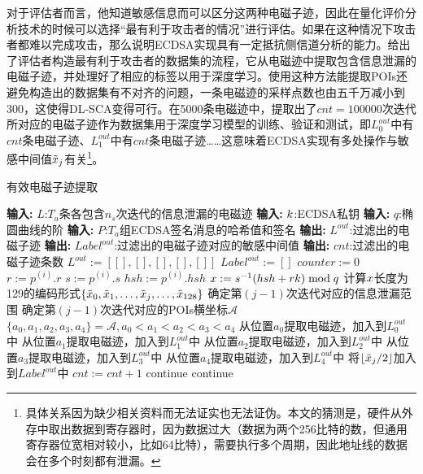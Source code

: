 {{	对于评估者而言，他知道敏感信息而可以区分这两种电磁子迹，因此在量化评价分析技术的时候可以选择“最有利于攻击者的情况”进行评估。如果在这种情况下攻击者都难以完成攻击，那么说明ECDSA实现具有一定抵抗侧信道分析的能力。给出了评估者构造最有利于攻击者的数据集的流程，它从电磁迹中提取包含信息泄漏的电磁子迹，并处理好了相应的标签以用于深度学习。使用这种方法能提取POIs还避免构造出的数据集有不对齐的问题，一条电磁迹的采样点数也由五千万减小到300，这使得DL-SCA变得可行。在5000条电磁迹中，提取出了$cnt=100000$次迭代所对应的电磁子迹作为数据集用于深度学习模型的训练、验证和测试，即$L_0^{out}$中有$cnt$条电磁子迹、$L_1^{out}$中有$cnt$条电磁子迹……这意味着ECDSA实现有多处操作与敏感中间值$\tilde {x}_j$有关\footnote{具体关系因为缺少相关资料而无法证实也无法证伪。本文的猜测是，硬件从外存中取出数据到寄存器时，因为数据过大（数据为两个256比特的数，但通用寄存器位宽相对较小，比如64比特），需要执行多个周期，因此地址线的数据会在多个时刻都有泄漏。}。
	
	\begin{breakablealgorithm}
		\caption{有效电磁子迹提取}\label{alg:filter}
		\begin{algorithmic}[1]
			\Statex \textbf{输入:} $L$:$T_a$条各包含$n_s$次迭代的信息泄漏的电磁迹
			\Statex \textbf{输入:} $k$:ECDSA私钥
			\Statex \textbf{输入:} $q$:椭圆曲线的阶
			\Statex \textbf{输入:} $P$:$T_a$组ECDSA签名消息的哈希值和签名
			\Statex \textbf{输出:} $L^{out}$:过滤出的电磁子迹
			\Statex \textbf{输出:} $Label^{out}$:过滤出的电磁子迹对应的敏感中间值
			\Statex \textbf{输出:} $cnt$:过滤出的电磁子迹条数
			\State $L^{out}:=\left[ [],[],[],[],[]\right] $
			\State $Label^{out}:=[]$
			\State $counter:=0$
				\State $r:=p^{(i)}.r$
				\State $s:=p^{(i)}.s$
				\State $hsh:=p^{(i)}.hsh$
				\State $x:=s^{-1}(hsh+rk)\bmod q$
				\State 计算$x$长度为129的编码形式$\left\{\tilde{x}_0,\tilde{x}_1,\dots,\tilde{x}_j,\dots, \tilde{x}_{128}\right\}$
						\State 确定第$(j-1)$次迭代对应的信息泄漏范围
						\State 确定第$(j-1)$次迭代对应的POIs横坐标$\mathcal A$
							\State $\{a_0,a_1,a_2,a_3,a_4\}=\mathcal A,a_0<a_1<a_2<a_3<a_4$
							\State 从位置$a_0$提取电磁迹，加入到$L_0^{out}$中
							\State 从位置$a_1$提取电磁迹，加入到$L_1^{out}$中
							\State 从位置$a_2$提取电磁迹，加入到$L_2^{out}$中
							\State 从位置$a_3$提取电磁迹，加入到$L_3^{out}$中
							\State 从位置$a_4$提取电磁迹，加入到$L_4^{out}$中
							\State 将$\left\lfloor\tilde{x}_j/2\right\rfloor$加入到$Label^{out}$中
							\State $cnt:=cnt+1$
						\Else
							\State continue
						\EndIf
					\Else
						\State continue
					\EndIf
				\EndFor
			\EndFor
		\end{algorithmic}
	\end{breakablealgorithm}
	
}}
